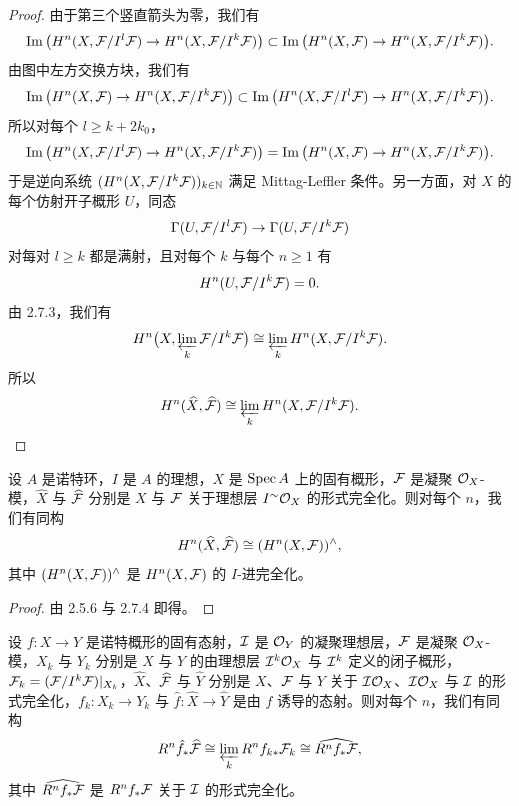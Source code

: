 \begin{proof}
由于第三个竖直箭头为零，我们有
\begin{equation*}
\operatorname{Im}\big(H^n(X,\mathcal{F}/I^l\mathcal{F})\to H^n(X,\mathcal{F}/I^k\mathcal{F})\big)\subset\operatorname{Im}\big(H^n(X,\mathcal{F})\to H^n(X,\mathcal{F}/I^k\mathcal{F})\big).
\end{equation*}
由图中左方交换方块，我们有
\begin{equation*}
\operatorname{Im}\big(H^n(X,\mathcal{F})\to H^n(X,\mathcal{F}/I^k\mathcal{F})\big)\subset\operatorname{Im}\big(H^n(X,\mathcal{F}/I^l\mathcal{F})\to H^n(X,\mathcal{F}/I^k\mathcal{F})\big).
\end{equation*}
所以对每个 $l\ge k+2k_0$，
\begin{equation*}
\operatorname{Im}\big(H^n(X,\mathcal{F}/I^l\mathcal{F})\to H^n(X,\mathcal{F}/I^k\mathcal{F})\big)=\operatorname{Im}\big(H^n(X,\mathcal{F})\to H^n(X,\mathcal{F}/I^k\mathcal{F})\big).
\end{equation*}
于是逆向系统 $(H^n(X,\mathcal{F}/I^k\mathcal{F}))_{k\in\mathbb{N}}$ 满足 Mittag-Leffler 条件。另一方面，对 $X$ 的每个仿射开子概形 $U$，同态
\begin{equation*}
\Gamma(U,\mathcal{F}/I^l\mathcal{F})\to\Gamma(U,\mathcal{F}/I^k\mathcal{F})
\end{equation*}
对每对 $l\ge k$ 都是满射，且对每个 $k$ 与每个 $n\ge1$ 有
\begin{equation*}
H^n(U,\mathcal{F}/I^k\mathcal{F})=0.
\end{equation*}
由 2.7.3，我们有
\begin{equation*}
H^n\big(X,\varprojlim_k\mathcal{F}/I^k\mathcal{F}\big)\cong\varprojlim_k H^n(X,\mathcal{F}/I^k\mathcal{F}).
\end{equation*}
所以
\begin{equation*}
H^n(\widehat{X},\widehat{\mathcal{F}})\cong\varprojlim_k H^n(X,\mathcal{F}/I^k\mathcal{F}).
\end{equation*}
\end{proof}

\begin{corollary}\label{it:2.7.5}
设 $A$ 是诺特环，$I$ 是 $A$ 的理想，$X$ 是 $\operatorname{Spec} A$ 上的固有概形，$\mathcal{F}$ 是凝聚 $\mathcal{O}_X$-模，$\widehat{X}$ 与 $\widehat{\mathcal{F}}$ 分别是 $X$ 与 $\mathcal{F}$ 关于理想层 $I^{\sim}\mathcal{O}_X$ 的形式完全化。则对每个 $n$，我们有同构
\begin{equation*}
H^n(\widehat{X},\widehat{\mathcal{F}})\cong(H^n(X,\mathcal{F}))^{\wedge},
\end{equation*}
其中 $(H^n(X,\mathcal{F}))^{\wedge}$ 是 $H^n(X,\mathcal{F})$ 的 $I$-进完全化。
\end{corollary}

\begin{proof}
由 2.5.6 与 2.7.4 即得。
\end{proof}

\begin{corollary}\label{it:2.7.6}
设 $f\colon X\to Y$ 是诺特概形的固有态射，$\mathcal{I}$ 是 $\mathcal{O}_Y$ 的凝聚理想层，$\mathcal{F}$ 是凝聚 $\mathcal{O}_X$-模，$X_k$ 与 $Y_k$ 分别是 $X$ 与 $Y$ 的由理想层 $\mathcal{I}^k\mathcal{O}_X$ 与 $\mathcal{I}^k$ 定义的闭子概形，$\mathcal{F}_k=(\mathcal{F}/I^k\mathcal{F})|_{X_k}$，$\widehat{X}$、$\widehat{\mathcal{F}}$ 与 $\widehat{Y}$ 分别是 $X$、$\mathcal{F}$ 与 $Y$ 关于 $\mathcal{I}\mathcal{O}_X$、$\mathcal{I}\mathcal{O}_X$ 与 $\mathcal{I}$ 的形式完全化，$f_k\colon X_k\to Y_k$ 与 $\hat{f}\colon\widehat{X}\to\widehat{Y}$ 是由 $f$ 诱导的态射。则对每个 $n$，我们有同构
\begin{equation*}
R^n\hat{f}_*\widehat{\mathcal{F}}\cong\varprojlim_k R^nf_{k*}\mathcal{F}_k\cong\widehat{R^nf_*\mathcal{F}},
\end{equation*}
其中 $\widehat{R^nf_*\mathcal{F}}$ 是 $R^nf_*\mathcal{F}$ 关于 $\mathcal{I}$ 的形式完全化。
\end{corollary}

